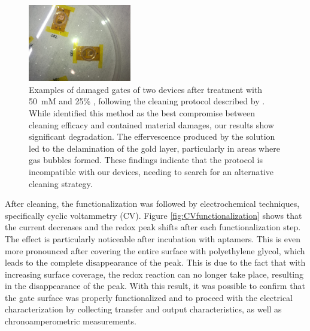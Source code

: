\begin{figure}
    \centering
    \includegraphics[width = 0.4\textwidth]{figures/chapter4/histamine/cleaningDamages.jpeg}
    \caption{Examples of damaged gates of two devices after treatment with \SI{50}{mM}  and 25\% , following the cleaning protocol described by \citet{heiskanenMonitoring2008}. While \citet{fischerGold2009} identified this method as the best compromise between cleaning efficacy and contained material damages, our results show significant degradation. The effervescence produced by the solution led to the delamination of the gold layer, particularly in areas where gas bubbles formed. These findings indicate that the protocol is incompatible with our devices, needing to search for an alternative cleaning strategy.}
    \label{fig:cleaningDamages}
\end{figure}

After cleaning, the functionalization was followed by electrochemical techniques, specifically cyclic voltammetry (CV). Figure \ref{fig:CVfunctionalization} shows that the current decreases and the redox peak shifts after each functionalization step. The effect is particularly noticeable after incubation with aptamers. This is even more pronounced after covering the entire surface with polyethylene glycol, which leads to the complete disappearance of the peak. This is due to the fact that with increasing surface coverage, the redox reaction can no longer take place, resulting in the disappearance of the peak. With this result, it was possible to confirm that the gate surface was properly functionalized and to proceed with the electrical characterization by collecting transfer and output characteristics, as well as chronoamperometric measurements.

